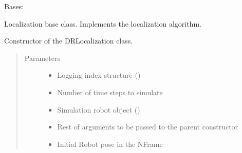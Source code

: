 \documentclass[letterpaper,10pt,english]{sphinxmanual}
\begin{document}
\begin{fulllineitems}
\label{\detokenize{Localization:Localization.Localization}}
\sphinxAtStartPar
Bases: 

\sphinxAtStartPar
Localization base class. Implements the localization algorithm.

\begin{fulllineitems}
\label{\detokenize{Localization:Localization.Localization.__init__}}
\sphinxAtStartPar
Constructor of the DRLocalization class.
\begin{quote}\begin{description}
\item[{Parameters}] \leavevmode\begin{itemize}
\item {} 
\sphinxAtStartPar
{} \textendash{} Logging index structure ()

\item {} 
\sphinxAtStartPar
{} \textendash{} Number of time steps to simulate

\item {} 
\sphinxAtStartPar
{} \textendash{} Simulation robot object ()

\item {} 
\sphinxAtStartPar
{} \textendash{} Rest of arguments to be passed to the parent constructor

\item {} 
\sphinxAtStartPar
{} \textendash{} Initial Robot pose in the N\sphinxhyphen{}Frame

\end{itemize}


\end{description}
\end{quote}
\end{fulllineitems}
\end{fulllineitems}
\end{document}
